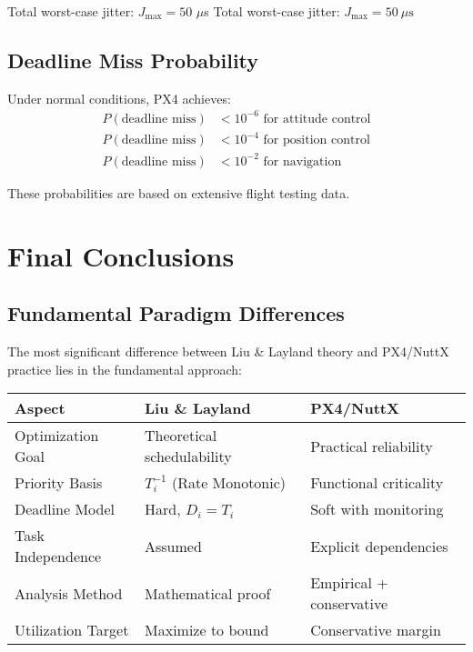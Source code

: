 \documentclass[12pt,a4paper]{article}
\begin{document}
Total worst-case jitter: $J_{\max} = 50$ $\mu$s
Total worst-case jitter: $J_{\max} = 50\ \mu\text{s}$

\subsection{Deadline Miss Probability}

Under normal conditions, PX4 achieves:
\begin{align}
P(\text{deadline miss}) &< 10^{-6} \text{ for attitude control} \\
P(\text{deadline miss}) &< 10^{-4} \text{ for position control} \\
P(\text{deadline miss}) &< 10^{-2} \text{ for navigation}
\end{align}

These probabilities are based on extensive flight testing data.

\section{Final Conclusions}

\subsection{Fundamental Paradigm Differences}

The most significant difference between Liu \& Layland theory and PX4/NuttX practice lies in the fundamental approach:

\begin{table}[H]
\centering
\begin{tabular}{|l|l|l|}
\hline
\textbf{Aspect} & \textbf{Liu \& Layland} & \textbf{PX4/NuttX} \\
\hline
Optimization Goal & Theoretical schedulability & Practical reliability \\
Priority Basis & $T_i^{-1}$ (Rate Monotonic) & Functional criticality \\
Deadline Model & Hard, $D_i = T_i$ & Soft with monitoring \\
Task Independence & Assumed & Explicit dependencies \\
Analysis Method & Mathematical proof & Empirical + conservative \\
Utilization Target & Maximize to bound & Conservative margin \\
\hline
\end{tabular}
\end{table}
\end{document}
